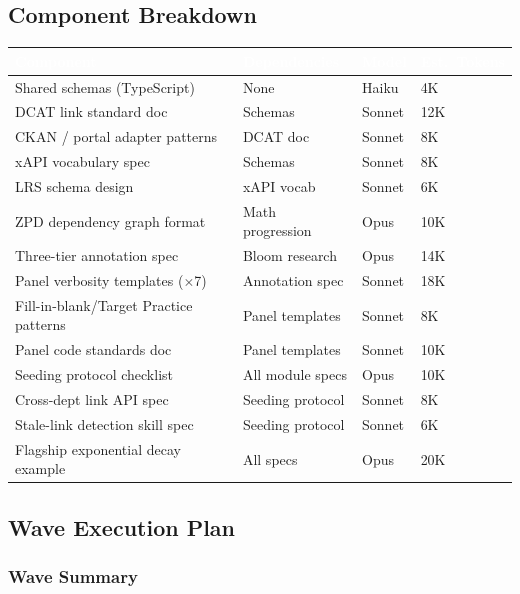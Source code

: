 \documentclass[11pt,letterpaper]{article}
\newcommand{\tableheader}[1]{\textbf{\sffamily\textcolor{white}{#1}}}
\begin{document}
\subsection{Component Breakdown}

\begin{center}
\begin{tabularx}{\textwidth}{L{4cm}L{2.5cm}C{1.5cm}C{1.5cm}}
\toprule
{}
\tableheader{Component} & \tableheader{Dependencies} & \tableheader{Model} & \tableheader{Est.\ Tokens} \\
\midrule
Shared schemas (TypeScript) & None & Haiku & 4K \\
DCAT link standard doc & Schemas & Sonnet & 12K \\
CKAN / portal adapter patterns & DCAT doc & Sonnet & 8K \\
xAPI vocabulary spec & Schemas & Sonnet & 8K \\
LRS schema design & xAPI vocab & Sonnet & 6K \\
ZPD dependency graph format & Math progression & Opus & 10K \\
Three-tier annotation spec & Bloom research & Opus & 14K \\
Panel verbosity templates ($\times$7) & Annotation spec & Sonnet & 18K \\
Fill-in-blank/Target Practice patterns & Panel templates & Sonnet & 8K \\
Panel code standards doc & Panel templates & Sonnet & 10K \\
Seeding protocol checklist & All module specs & Opus & 10K \\
Cross-dept link API spec & Seeding protocol & Sonnet & 8K \\
Stale-link detection skill spec & Seeding protocol & Sonnet & 6K \\
Flagship exponential decay example & All specs & Opus & 20K \\
\bottomrule
\end{tabularx}
\end{center}

\subsection{Wave Execution Plan}

\subsubsection{Wave Summary}
\end{document}
